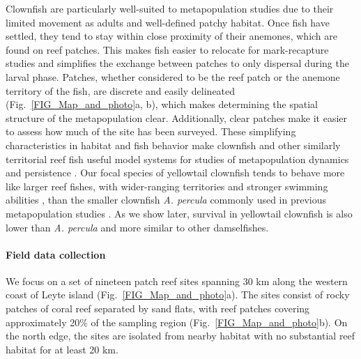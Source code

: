 \documentclass[12pt, oneside]{article}   	%
\begin{document}
Clownfish are particularly well-suited to metapopulation studies due to their limited movement as adults and well-defined patchy habitat. Once fish have settled, they tend to stay within close proximity of their anemones, which are found on reef patches. This makes fish easier to relocate for mark-recapture studies and simplifies the exchange between patches to only dispersal during the larval phase. Patches, whether considered to be the reef patch or the anemone territory of the fish, are discrete and easily delineated (Fig.\ \ref{FIG_Map_and_photo}a, b), which makes determining the spatial structure of the metapopulation clear. Additionally, clear patches make it easier to assess how much of the site has been surveyed. These simplifying characteristics in habitat and fish behavior make clownfish and other similarly territorial reef fish useful model systems for studies of metapopulation dynamics and persistence \citep[e.g.][]{buston2013marine, salles_coral_2015, johnson2018integrating}. Our focal species of yellowtail clownfish tends to behave more like larger reef fishes, with wider-ranging territories and stronger swimming abilities \citep{hattori1991life, ochi1989mating}, than the smaller clownfish \textit{A. percula} commonly used in previous metapopulation studies \citep[e.g.][]{buston2011probability, salles_coral_2015}. As we show later, survival in yellowtail clownfish is also lower than \textit{A. percula} and more similar to other damselfishes. 

\paragraph*{Field data collection}

We focus on a set of nineteen patch reef sites spanning 30 km along the western coast of Leyte island (Fig.\ \ref{FIG_Map_and_photo}a). The sites consist of rocky patches of coral reef separated by sand flats, with reef patches covering approximately 20\% of the sampling region (Fig.\ \ref{FIG_Map_and_photo}b). On the north edge, the sites are isolated from nearby habitat with no substantial reef habitat for at least 20 km. %
\end{document}
